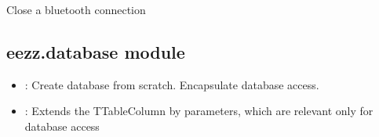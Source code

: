 \documentclass[letterpaper,10pt,english]{sphinxmanual}
\begin{document}
\begin{savenotes}
\begin{fulllineitems}
\begin{savenotes}
\begin{fulllineitems}
\begin{quote}
\begin{description}
\end{description}\end{quote}

\end{fulllineitems}\end{savenotes}


\begin{savenotes}\begin{fulllineitems}
\label{\detokenize{eezz:eezz.blueserv.TBluetoothService.shutdown}}
\pysigstartsignatures
{}
\pysigstopsignatures
\sphinxAtStartPar
Close a bluetooth connection

\end{fulllineitems}\end{savenotes}


\end{fulllineitems}\end{savenotes}



\subsection{eezz.database module}
\label{\detokenize{eezz:module-eezz.database}}\label{\detokenize{eezz:eezz-database-module}}\begin{itemize}
\item {} 
\sphinxAtStartPar
{}:   Create database from scratch. Encapsulate database access.

\item {} 
\sphinxAtStartPar
{}:  Extends the TTableColumn by parameters, which are relevant only for database access

\end{itemize}
\end{document}
